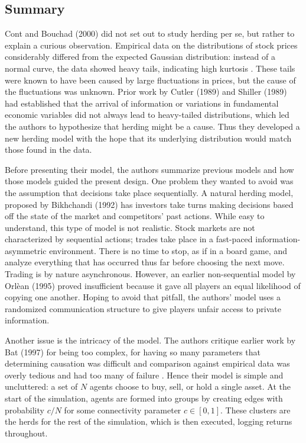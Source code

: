 \documentclass{article}
\begin{document}
\subsection{Summary}
Cont and Bouchad (2000) did not set out to study herding per se, but rather to explain a curious observation.
Empirical data on the distributions of stock prices considerably differed from the expected Gaussian distribution: instead of a normal curve, the data showed heavy tails, indicating high kurtosis \cite{cont}.
These tails were known to have been caused by large fluctuations in prices, but the cause of the fluctuations was unknown.
Prior work by Cutler (1989) and Shiller (1989) had established that the arrival of information or variations in fundamental economic variables did not always lead to heavy-tailed distributions, which led the authors to hypothesize that herding might be a cause.
Thus they developed a new herding model with the hope that its underlying distribution would match those found in the data.

Before presenting their model, the authors summarize previous models and how those models guided the present design.
One problem they wanted to avoid was the assumption that decisions take place sequentially.
A natural herding model, proposed by Bikhchandi (1992) has investors take turns making decisions based off the state of the market and competitors' past actions.
While easy to understand, this type of model is not realistic. 
Stock markets are not characterized by sequential actions; trades take place in a fast-paced information-asymmetric environment. 
There is no time to stop, as if in a board game, and analyze everything that has occurred thus far before choosing the next move. 
Trading is by nature asynchronous.
However, an earlier non-sequential model by Orl\`{e}an (1995) proved insufficient because it gave all players an equal likelihood of copying one another.
Hoping to avoid that pitfall, the authors' model uses a randomized communication structure to give players unfair access to private information.

Another issue is the intricacy of the model.
The authors critique earlier work by Bat (1997) for being too complex, for having so many parameters that determining causation was difficult and comparison against empirical data was overly tedious and had too many of failure \cite{cont}.
Hence their model is simple and uncluttered: a set of $N$ agents choose to buy, sell, or hold a single asset.
At the start of the simulation, agents are formed into groups by creating edges with probability $c/N$ for some connectivity parameter $c \in [0,1]$.
These clusters are the herds for the rest of the simulation, which is then executed, logging returns throughout.
\end{document}
